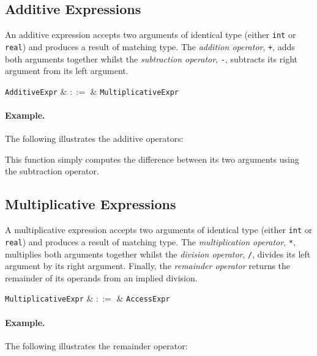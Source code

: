 \subsection{Additive Expressions}
\label{c_expr_add}

An additive expression accepts two arguments of identical type (either \lstinline{int} or \lstinline{real}) and produces a result of matching type.  The {\em addition operator}, \lstinline{+}, adds both arguments together whilst the {\em subtraction operator}, \lstinline{-}, subtracts its right argument from its left argument.

\begin{syntax}
  \verb+AdditiveExpr+ & $::=$ & \verb+MultiplicativeExpr+ \\
\end{syntax}

\paragraph{Example.}  The following illustrates the additive operators:



This function simply computes the difference between its two arguments using the subtraction operator.


\subsection{Multiplicative Expressions}
\label{c_expr_mul}

A multiplicative expression accepts two arguments of identical type (either \lstinline{int} or \lstinline{real}) and produces a result of matching type.  The {\em multiplication operator}, \lstinline{*}, multiplies both arguments together whilst the {\em division operator}, \lstinline{/}, divides its left argument by its right argument.  Finally, the {\em remainder operator} returns the remainder of its operands from an implied division.  

\begin{syntax}
  \verb+MultiplicativeExpr+ & $::=$ & \verb+AccessExpr+ \\
\end{syntax}

\paragraph{Example.} The following illustrates the remainder operator:

